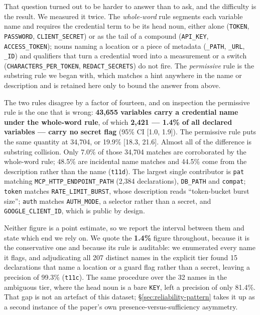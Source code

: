 \documentclass[a4paper,fleqn]{cas-dc}
\begin{document}
That question turned out to be harder to answer than to ask, and the difficulty
is the result. We measured it twice. The \emph{whole-word} rule segments each
variable name and requires the credential term to be its head noun, either
alone (\texttt{TOKEN}, \texttt{PASSWORD}, \texttt{CLIENT\_SECRET}) or as the
tail of a compound (\texttt{API\_KEY}, \texttt{ACCESS\_TOKEN}); nouns naming a
location or a piece of metadata (\texttt{\_PATH}, \texttt{\_URL}, \texttt{\_ID})
and qualifiers that turn a credential word into a measurement or a switch
(\texttt{CHARACTERS\_PER\_TOKEN}, \texttt{REDACT\_SECRETS}) do not fire. The
\emph{permissive} rule is the substring rule we began with, which matches a
hint anywhere in the name or description and is retained here only to bound the
answer from above.

The two rules disagree by a factor of fourteen, and on inspection the permissive
rule is the one that is wrong: \textbf{43,655 variables carry a credential name
under the whole-word rule}, of which \textbf{2,421 --- 1.4\% of all declared
variables --- carry no secret flag} (95\% CI [1.0, 1.9]). The permissive rule
puts the same quantity at 34,704, or 19.9\% [18.3, 21.6]. Almost all of the
difference is substring collision. Only 7.0\% of those 34,704 matches are
corroborated by the whole-word rule; 48.5\% are incidental name matches and
44.5\% come from the description rather than the name (\texttt{t11d}). The
largest single contributor is \texttt{pat} matching
\texttt{MCP\_HTTP\_ENDPOINT\_PATH} (2,384 declarations),
\texttt{DB\_PATH} and \texttt{compat}; \texttt{token} matches
\texttt{RATE\_LIMIT\_BURST}, whose description reads ``token-bucket burst
size''; \texttt{auth} matches \texttt{AUTH\_MODE}, a selector rather than a
secret, and \texttt{GOOGLE\_CLIENT\_ID}, which is public by design.

Neither figure is a point estimate, so we report the interval between them and
state which end we rely on. We quote the \textbf{1.4\%} figure throughout,
because it is the conservative one and because its rule is auditable: we
enumerated every name it flags, and adjudicating all 207 distinct names in the
explicit tier found 15 declarations that name a location or a guard flag rather
than a secret, leaving a precision of 99.3\% (\texttt{t11c}). The same procedure
over the 32 names in the ambiguous tier, where the head noun is a bare
\texttt{KEY}, left a precision of only 81.4\%. That gap is not an artefact of
this dataset; \S\ref{sec:reliability-pattern} takes it up as a second instance
of the paper's own presence-versus-sufficiency asymmetry.
\end{document}
